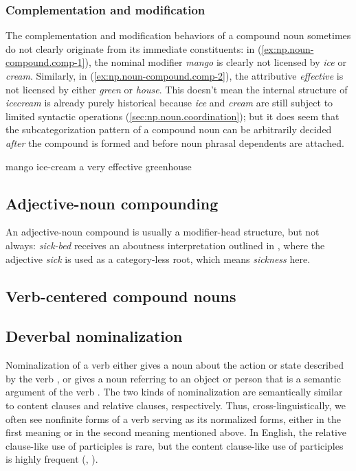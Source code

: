 \documentclass[UTF8, a4paper, oneside, scheme=plain, 12pt]{ctexbook}
\newcommand*{\citepage}[1]{p.~{#1}}
\newcommand{\form}[1]{\emph{#1}}
\begin{document}
\subsubsection{Complementation and modification}\label{sec:np.noun-compound.license}

The complementation and modification behaviors of a compound noun 
sometimes do not clearly originate 
from its immediate constituents: 
in (\ref{ex:np.noun-compound.comp-1}), 
the nominal modifier \form{mango} 
is clearly not licensed by \form{ice} or \form{cream}. 
Similarly, in (\ref{ex:np.noun-compound.comp-2}), 
the attributive \form{effective} is not licensed by either \form{green} or \form{house}. 
This doesn't mean the internal structure of \form{icecream} is already purely historical 
because \form{ice} and \form{cream} are still subject to limited syntactic operations 
(\ref{sec:np.noun.coordination}); 
but it does seem that the subcategorization pattern of 
a compound noun can be arbitrarily decided 
\emph{after} the compound is formed
and before noun phrasal dependents are attached.

\begin{exe}
    \ex\label{ex:np.noun-compound.comp-1} mango ice-cream 
    \ex\label{ex:np.noun-compound.comp-2} a very effective greenhouse
\end{exe}

\subsection{Adjective-noun compounding}

An adjective-noun compound is usually a modifier-head structure, 
but not always: 
\form{sick-bed} receives an aboutness interpretation outlined in ,
where the adjective \form{sick} is used as a category-less root,
which means \form{sickness} here.

\subsection{Verb-centered compound nouns}\label{sec:pos.noun.compound.verb-centered}

\subsection{Deverbal nominalization}

Nominalization of a verb either gives a noun about the action or state described by the verb
\citep[\citepage{1700}]{cgel},
or gives a noun referring to an object or person 
that is a semantic argument of the verb \citep[\citepage{1697}]{cgel}.
The two kinds of nominalization are semantically similar to 
content clauses and relative clauses, respectively.
Thus, cross-linguistically, 
we often see nonfinite forms of a verb serving as 
its normalized forms,
either in the first meaning or in the second meaning mentioned above.
In English, the relative clause-like use of participles is rare, 
but the content clause-like use of participles is highly frequent
(, ).
\end{document}
